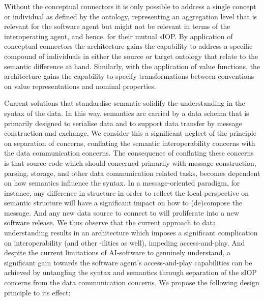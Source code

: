 \documentclass[sort&compress,preprint,authoryear,3p,twocolumn]{elsarticle}
\begin{document}
Without the conceptual connectors it is only possible to address a
single concept or individual as defined by the ontology, representing an
aggregation level that is relevant for the software agent but might not
be relevant in terms of the interoperating agent, and hence, for their
mutual sIOP. By application of conceptual connectors the architecture
gains the capability to address a specific compound of individuals in
either the source or target ontology that relate to the semantic
difference at hand. Similarly, with the application of value functions,
the architecture gains the capability to specify transformations between
conventions on value representations and nominal properties.

Current solutions that standardise semantic solidify the understanding
in the syntax of the data. In this way, semantics are carried by a data
schema that is primarily designed to serialise data and to support data
transfer by message construction and exchange. We consider this a
significant neglect of the principle on separation of concerns,
conflating the semantic interoperability concerns with the data
communication concerns. The consequence of conflating these concerns is
that source code which should concerned primarily with message
construction, parsing, storage, and other data communication related
tasks, becomes dependent on how semantics influence the syntax. In a
message-oriented paradigm, for instance, any difference in structure in
order to reflect the local perspective on semantic structure will have a
significant impact on how to (de)compose the message. And any new data
source to connect to will proliferate into a new software release. We
thus observe that the current approach to data understanding results in
an architecture which imposes a significant complication on
interoperability (and other -ilities as well), impeding access-and-play.
And despite the current limitations of AI-software to genuinely
understand, a significant gain towards the software agent's
access-and-play capabilities can be achieved by untangling the syntax
and semantics through separation of the sIOP concerns from the data
communication concerns. We propose the following design principle to its
effect:
\end{document}
